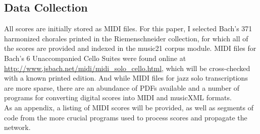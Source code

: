 \documentclass[11pt]{article}
\begin{document}
\subsection{Data Collection}

All scores are initially stored as MIDI files. For this paper, I selected Bach's 371 harmonized chorales printed in the Riemenschneider collection, for which all of the scores are provided and indexed in the music21 corpus module. MIDI files for Bach's 6 Unaccompanied Cello Suites were found online at \url{http://www.jsbach.net/midi/midi_solo_cello.html}, which will be cross-checked with a known printed edition. And while MIDI files for jazz solo transcriptions are more sparse, there are an abundance of PDFs available and a number of programs for converting digital scores into MIDI and musicXML formats. \\

\noindent As an appendix, a listing of MIDI scores will be provided, as well as segments of code from the more crucial programs used to process scores and propagate the network. 

\newpage

\nocite{*}
 

\end{document}
